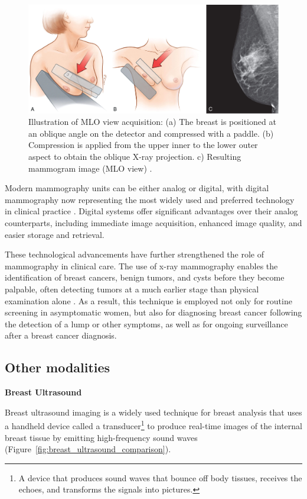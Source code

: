\documentclass[a4paper,10pt]{book}
\begin{document}
\begin{figure}[h!]
    \centering
    \includegraphics[width=0.6\linewidth]{reports//assets/mlo_view.jpg}
    \caption[MLO view acquisition procedure]{Illustration of MLO view acquisition: (a) The breast is positioned at an oblique angle on the detector and compressed with a paddle. (b) Compression is applied from the upper inner to the lower outer aspect to obtain the oblique X-ray projection. c) Resulting mammogram image (MLO view) \cite{imaging_introduction_2022}.}
    \label{fig:mlo_view}
\end{figure}


Modern mammography units can be either analog or digital, with digital mammography now representing the most widely used and preferred technology in clinical practice \cite{ltd_mammography_2025, noauthor_mammography_nodate}. Digital systems offer significant advantages over their analog counterparts, including immediate image acquisition, enhanced image quality, and easier storage and retrieval.

These technological advancements have further strengthened the role of mammography in clinical care. The use of x-ray mammography enables the identification of breast cancers, benign tumors, and cysts before they become palpable, often detecting tumors at a much earlier stage than physical examination alone \cite{staff_what_2025}. As a result, this technique is employed not only for routine screening in asymptomatic women, but also for diagnosing breast cancer following the detection of a lump or other symptoms, as well as for ongoing surveillance after a breast cancer diagnosis.

\subsection{Other modalities}

\textbf{Breast Ultrasound}

Breast ultrasound imaging is a widely used technique for breast analysis that uses a handheld device called a transducer\footnote{A device that produces sound waves that bounce off body tissues, receives the echoes, and transforms the signals into pictures.} to produce real-time images of the internal breast tissue by emitting high-frequency sound waves (Figure~\ref{fig:breast_ultrasound_comparison}).
\end{document}
